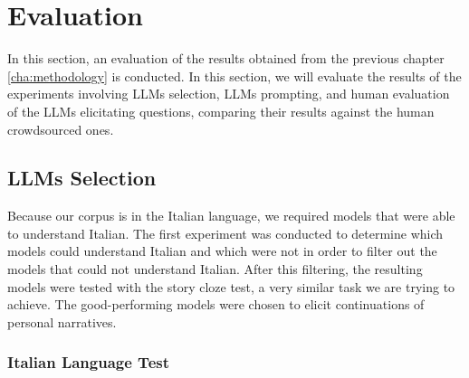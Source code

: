 \chapter{Evaluation}
\label{cha:evaluation}

In this section, an evaluation of the results obtained from the previous chapter \ref{cha:methodology} is conducted. In this section, we will evaluate the results of the experiments involving LLMs selection, LLMs prompting, and human evaluation of the LLMs elicitating questions, comparing their results against the human crowdsourced ones.

\section{LLMs Selection}
\label{cha:evaluation-LLMs-selection}

Because our corpus is in the Italian language, we required models that were able to understand Italian. The first experiment was conducted to determine which models could understand Italian and which were not in order to filter out the models that could not understand Italian. After this filtering, the resulting models were tested with the story cloze test, a very similar task we are trying to achieve. The good-performing models were chosen to elicit continuations of personal narratives.

\subsection{Italian Language Test}


